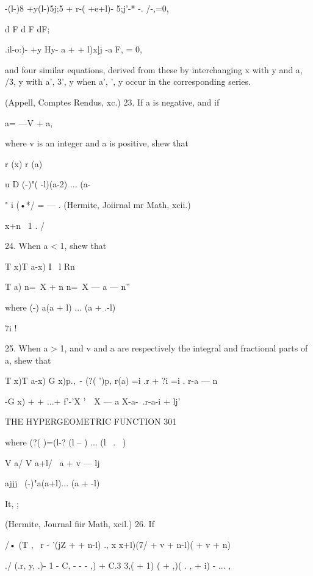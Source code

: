 -(l-)8 +y(l-)5j;5 + r-( +e+l)- 5;j'-* -. /-,=0,

d F d F dF;

.il-o:)- +y Hy- a + + l)x]j -a F, = 0,

and four similar equations, derived from these by interchanging x with
y and a, /3, y with a', 3', y when a', ', y occur in the corresponding
series.

(Appell, Comptes Rendus, xc.) 23. If a is negative, and if

a= —V + a,

where v is an integer and a is positive, shew that



r (x) r (a)






u D (-)"( -l)(a-2) ... (a-%



" i (•*/ = — . (Hermite, Joiirnal mr Math, xcii.)

x+n \ 1 . /



24. When a < 1, shew that



T x)T a-x) I \ l Rn



T a) n=\ X + n n=\ X — a — n''

where (-) a(a + l) ... (a + .-l)

7i !

25. When a > 1, and v and a are respectively the integral and
fractional parts of a, shew that

T x)T a-x) G x)p.,\ - (?( ')p, r(a) =i .r + ?i =i . r-a — n

-G x) + + ...+ f'-'X '\ \ X — a X-a-\ .r-a-i + lj'



THE HYPERGEOMETRIC FUNCTION 301



where (?( )=(l-? (l -- ) ... (l \ . \ )

V a/ V a+l/ \ a + v — lj

ajjj \ (-)"a(a+l)... (a + -l)



It, ;

(Hermite, Journal fiir Math, xcil.) 26. If

/• (T , \ r - '(jZ + + n-l) ., x x+l)(7/ + v + n-l)( + v + n)

./ (.r, y, .)- 1 - C, - - - ,) + C.3 3,( + 1) ( + ,)( . , + i) - ... ,

